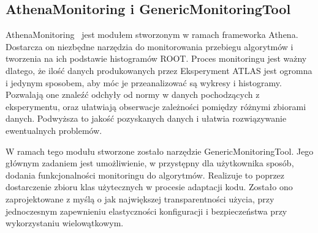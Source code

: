 \subsection{AthenaMonitoring i GenericMonitoringTool}
AthenaMonitoring~\cite{atlas-athena-monitoring} jest modułem stworzonym w ramach frameworka Athena.
Dostarcza on niezbędne narzędzia do monitorowania przebiegu algorytmów i tworzenia na ich podstawie histogramów ROOT.
Proces monitoringu jest ważny dlatego, że ilość danych produkowanych przez Eksperyment ATLAS jest ogromna i jedynym sposobem, aby móc je przeanalizować są wykresy i histogramy.
Pozwalają one znaleźć odchyły od normy w danych pochodzących z eksperymentu, oraz ułatwiają obserwacje zależności pomiędzy różnymi zbiorami danych.
Podwyższa to jakość pozyskanych danych i ułatwia rozwiązywanie ewentualnych problemów.

W ramach tego modułu stworzone zostało narzędzie GenericMonitoringTool. 
Jego głównym zadaniem jest umożliwienie, w przystępny dla użytkownika sposób, dodania funkcjonalności monitoringu do algorytmów.
Realizuje to poprzez dostarczenie zbioru klas użytecznych w procesie adaptacji kodu. 
Zostało ono zaprojektowane z myślą o jak największej transparentności użycia, przy jednoczesnym zapewnieniu elastyczności konfiguracji i bezpieczeństwa przy wykorzystaniu wielowątkowym.